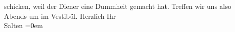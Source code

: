 \begin{ledgroupsized}[t]{13cm}
               schicken, weil der Diener eine Dummheit gemacht hat. Treffen wir uns also
                  Abends um \label{K_L03278-2v}\label{K_L03278-2h} im Vestibül.\pend
           \pstart
           Herzlich Ihr {\\[\baselineskip]}\spacefill\mbox{Salten}\pend
           \leftskip=0em{}
         
         \endnumbering{}\end{ledgroupsized}  \newcommand{\dateiname}{L03278}\newcommand{\titel}{Felix Salten an Arthur Schnitzler, [4. 1.? 1898]}\newcommand{\editorInnen}{Martin Anton Müller und Laura Untner}
      